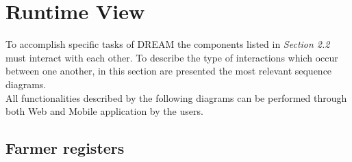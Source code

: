 \section{Runtime View}

To accomplish specific tasks of DREAM the components listed in \textit{Section 2.2} must interact with each other. To describe the type of interactions which occur between one another, in this section are presented the most relevant sequence diagrams.\\
All functionalities described by the following diagrams can be performed through both Web and Mobile application by the users. 


\def\fillandplacepagenumber{%
 \par\pagestyle{empty}%
\vbox to 0pt{\vss}\vfill
\vbox to 0pt{\baselineskip0pt
   \hbox to\linewidth{\hss}%
   \setlength{\footskip}{70pt}
   \baselineskip\footskip
   \hbox to\linewidth{%
     \hfil\thepage\hfil}\vss}}

\subsection{Farmer registers}

